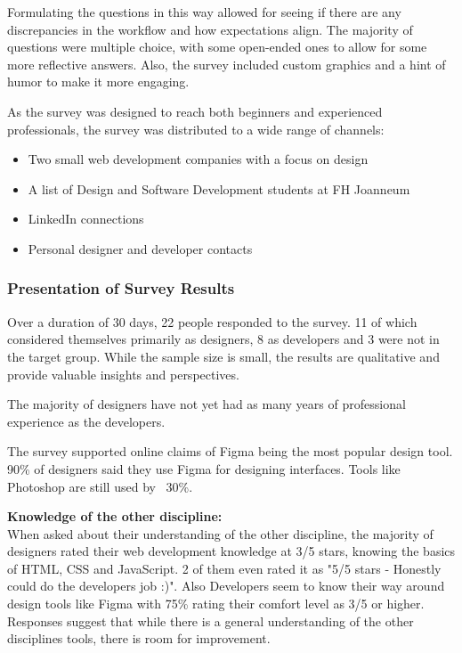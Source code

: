 Formulating the questions in this way allowed for seeing if there are any discrepancies in the
workflow and how expectations align. The majority of questions were multiple choice, with some
open-ended ones to allow for some more reflective answers. Also, the survey included custom graphics
and a hint of humor to make it more engaging.

As the survey was designed to reach both beginners and experienced professionals, the survey was
distributed to a wide range of channels:
\begin{itemize}
    \item Two small web development companies with a focus on design
    \item A list of Design and Software Development students at FH Joanneum
    \item LinkedIn connections
    \item Personal designer and developer contacts
\end{itemize}

\subsubsection{Presentation of Survey Results}
Over a duration of 30 days, 22 people responded to the survey. 11 of which considered themselves
primarily as designers, 8 as developers and 3 were not in the target group. While the sample size is
small, the results are qualitative and provide valuable insights and perspectives.

The majority of designers have not yet had as many years of professional experience as the
developers.  %

The survey supported online claims of Figma being the most popular design tool. 90\% of designers
said they use Figma for designing interfaces. Tools like Photoshop are still used by ~30\%.

\textbf{Knowledge of the other discipline:}\\
When asked about their understanding of the other discipline, the majority of designers rated their
web development knowledge at 3/5 stars, knowing the basics of HTML, CSS and JavaScript. 2 of
them even rated it as "5/5 stars - Honestly could do the developers job :)". Also Developers seem to
know their way around design tools like Figma with 75\% rating their comfort level as 3/5 or higher.
Responses suggest that while there is a general understanding of the other disciplines tools, there
is room for improvement.

